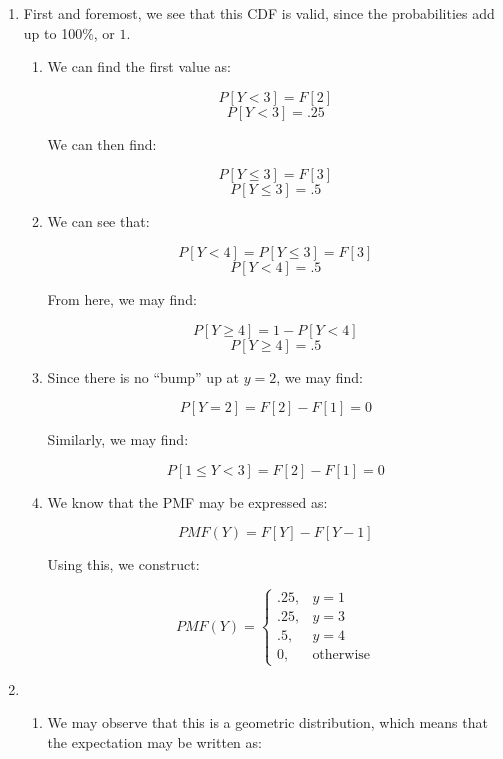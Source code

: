 \begin{enumerate}
  \item First and foremost, we see that this CDF is valid, since the probabilities add up to 100\%, or $1$.

    \begin{enumerate}

      \item We can find the first value as:

        $$P[Y<3] = F[2]$$
        $$\boxed{P[Y<3] =.25}$$

        We can then find:

        $$P[Y\leq 3]=F[3]$$
        $$\boxed{P[Y\leq3] =.5}$$

      \item We can see that:

        $$P[Y< 4]=P[Y\leq 3]=F[3]$$
        $$\boxed{P[Y< 4]=.5}$$

        From here, we may find:

        $$P[Y\geq 4]=1-P[Y<4]$$
        $$\boxed{P[Y\geq 4]=.5}$$

      \item Since there is no ``bump'' up at $y=2$, we may find:

        $$\boxed{P[Y=2]=F[2]-F[1]=0}$$

        Similarly, we may find:

        $$\boxed{P[1\leq Y<3]=F[2]-F[1]=0}$$

      \item We know that the PMF may be expressed as:

        $$PMF(Y)=F[Y]-F[Y-1]$$

        Using this, we construct:

        $$\boxed{PMF(Y)=\left\{ \begin{array}{ll} .25, & y=1\\.25, & y=3\\.5, & y=4\\ 0, & \text{otherwise} \end{array}}$$

    \end{enumerate}

  \item 

    \begin{enumerate}

      \item We may observe that this is a geometric distribution, which means that the expectation may be written as:


\end{enumerate}
\end{enumerate}
